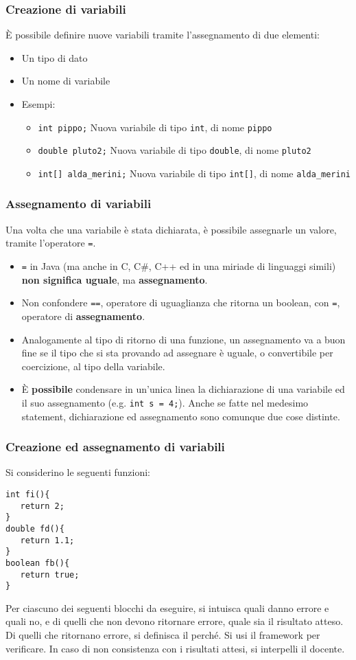 \documentclass{beamer}
\begin{document}
\begin{frame}[fragile]
\frametitle{Creazione di variabili}
È possibile definire nuove variabili tramite l'assegnamento di due elementi:
\begin{itemize}
 \item Un tipo di dato
 \item Un nome di variabile
 \item Esempi:
\begin{itemize}
 \item \texttt{int pippo;} Nuova variabile di tipo \texttt{int}, di nome \texttt{pippo}
 \item \texttt{double pluto2;}  Nuova variabile di tipo \texttt{double}, di nome \texttt{pluto2}
 \item \texttt{int[] alda\_merini;} Nuova variabile di tipo \texttt{int[]}, di nome \texttt{alda\_merini}
\end{itemize}
\end{itemize}
\end{frame}

\begin{frame}[fragile]
\frametitle{Assegnamento di variabili}
Una volta che una variabile è stata dichiarata, è possibile assegnarle un valore, tramite l'operatore \texttt{=}.
\begin{itemize}
 \item \texttt{=} in Java (ma anche in C, C\#, C++ ed in una miriade di linguaggi simili) \textbf{non significa uguale}, ma \textbf{assegnamento}.
 \item Non confondere \texttt{==}, operatore di uguaglianza che ritorna un boolean, con \texttt{=}, operatore di \textbf{assegnamento}.
 \item Analogamente al tipo di ritorno di una funzione, un assegnamento va a buon fine se il tipo che si sta provando ad assegnare è uguale, o convertibile per coercizione, al tipo della variabile.
 \item È \textbf{possibile} condensare in un'unica linea la dichiarazione di una variabile ed il suo assegnamento (e.g. \texttt{int s = 4;}). Anche se fatte nel medesimo statement, dichiarazione ed assegnamento sono comunque due cose distinte.
\end{itemize}
\end{frame}

\begin{frame}[fragile]
\frametitle{Creazione ed assegnamento di variabili}
Si considerino le seguenti funzioni:
\begin{verbatim}
int fi(){
   return 2;
}
double fd(){
   return 1.1;
}
boolean fb(){
   return true;
}
\end{verbatim}
Per ciascuno dei seguenti blocchi da eseguire, si intuisca quali danno errore e quali no, e di quelli che non devono ritornare errore, quale sia il risultato atteso. Di quelli che ritornano errore, si definisca il perché. Si usi il framework per verificare. In caso di non consistenza con i risultati attesi, si interpelli il docente.
\end{frame}
\end{document}
